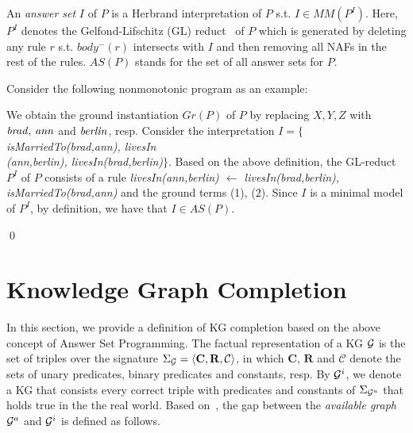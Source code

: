 An \textit{answer set} $I$ of $P$ is a Herbrand interpretation of $P$ s.t. $I \in MM(P^I)$. Here, $P^I$ denotes the Gelfond-Lifschitz (GL) reduct~\cite{ref50} of $P$ which is generated by deleting any rule $r$ s.t. $body^-(r)$ intersects with $I$ and then removing all NAFs in the rest of the rules. $AS(P)$ stands for the set of all answer sets for $P$.

\begin{example}\label{ex:as}
Consider the following nonmonotonic program as an example:\\
{\small {}}

\normalsize
{\smallskip

\noindent            
We obtain the ground instantiation $Gr(P)$ of $P$ by replacing $X,Y,Z$ with $\mathit{brad, \,ann}$ and $\mathit{berlin}$, resp. Consider the interpretation $I=\{${\small\textit{isMarriedTo(brad,ann), livesIn\\(ann,berlin), livesIn(brad,berlin)}}$\}$. Based on the above definition, the GL-reduct $P^I$ of $P$ consists of a rule \textit{livesIn(ann,berlin) $\leftarrow$ livesIn(brad,berlin), isMarriedTo(brad,ann)} and the ground terms (1), (2). Since $I$ is a minimal model of $P^I$, by definition, we have that $I \in AS(P)$.}\qed
\end{example}

\section{Knowledge Graph Completion}

In this section, we provide a definition of KG completion based on the above concept of Answer Set Programming. The factual representation of a KG $\mathcal{G}$ is the set of triples over the signature $\Sigma_{\mathcal{G}}=\langle\mathbf{C},\mathbf{R},\mathcal{C}\rangle$, in which $\mathbf{C}$, $\mathbf{R}$ and $\mathcal{C}$ denote the sets of unary predicates, binary predicates and constants, resp. By $\mathcal{G}^i$, we denote a KG that consists every correct triple with predicates and constants of $\Sigma_{\mathcal{G}^a}$ that holds true in the the real world. Based on~\cite{ref51}, the gap between the \emph{available graph} $\mathcal{G}^a$ and $\mathcal{G}^i$ is defined as follows.

